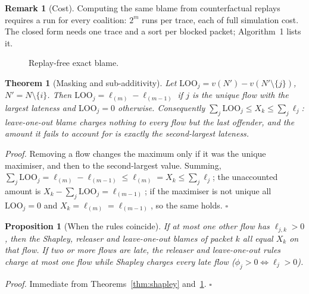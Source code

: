 \documentclass[11pt]{article}
\newtheorem{theorem}{Theorem}
\newtheorem{proposition}{Proposition}
\theoremstyle{definition}
\newtheorem{remark}{Remark}
\begin{document}
\begin{remark}[Cost]
Computing the same blame from counterfactual replays requires a run for every coalition: $2^{m}$ runs per trace, each of full simulation cost. The closed form needs one trace and a sort per blocked packet; Algorithm~1 lists it.
\end{remark}
\begin{figure}[h]
\centering\small
{}
\caption{Replay-free exact blame.}\label{alg:blame}
\end{figure}

\begin{theorem}[Masking and sub-additivity]\label{thm:masking}
Let $\mathrm{LOO}_j=v(N')-v(N'\setminus\{j\})$, $N'=N\setminus\{i\}$. Then $\mathrm{LOO}_j=\ell_{(m)}-\ell_{(m-1)}$ if $j$ is the unique flow with the largest lateness and $\mathrm{LOO}_j=0$ otherwise. Consequently $\sum_j\mathrm{LOO}_j\le X_k\le\sum_j\ell_j$: leave-one-out blame charges nothing to every flow but the last offender, and the amount it fails to account for is exactly the second-largest lateness.
\end{theorem}
\emph{Proof.} Removing a flow changes the maximum only if it was the unique maximiser, and then to the second-largest value. Summing, $\sum_j\mathrm{LOO}_j=\ell_{(m)}-\ell_{(m-1)}\le\ell_{(m)}=X_k\le\sum_j\ell_j$; the unaccounted amount is $X_k-\sum_j\mathrm{LOO}_j=\ell_{(m-1)}$; if the maximiser is not unique all $\mathrm{LOO}_j=0$ and $X_k=\ell_{(m)}=\ell_{(m-1)}$, so the same holds. \hfill$\square$

\begin{proposition}[When the rules coincide]\label{prop:coincide}
If at most one other flow has $\ell_{j,k}>0$, then the Shapley, releaser and leave-one-out blames of packet $k$ all equal $X_k$ on that flow. If two or more flows are late, the releaser and leave-one-out rules charge at most one flow while Shapley charges every late flow ($\phi_j>0\iff\ell_j>0$).
\end{proposition}
\emph{Proof.} Immediate from Theorems~\ref{thm:shapley} and~\ref{thm:masking}. \hfill$\square$
\end{document}
